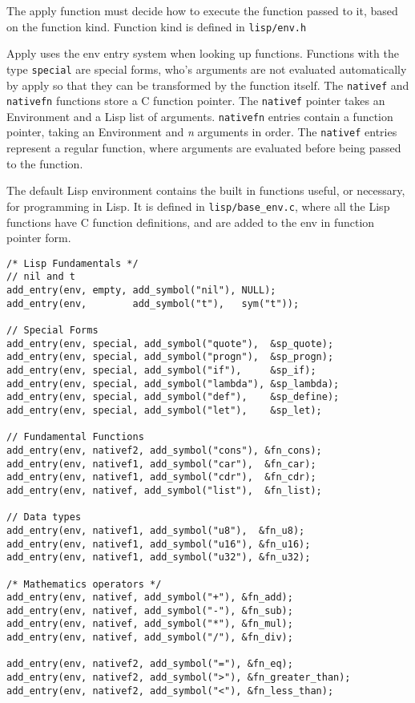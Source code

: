 \documentclass[10pt]{report}
\begin{document}
The apply function must decide how to execute the function passed to it, based on the function kind. Function kind is defined in \texttt{lisp/env.h} 



Apply uses the env entry system when looking up functions. Functions with the type \texttt{special} are special forms, who's arguments are not evaluated automatically by apply so that they can be transformed by the function itself. The \texttt{nativef} and \texttt{nativefn} functions store a C function pointer. The \texttt{nativef} pointer takes an Environment and a Lisp list of arguments. \texttt{nativefn} entries contain a function pointer, taking an Environment and \textit{n} arguments in order. The \texttt{nativef} entries represent a regular function, where arguments are evaluated before being passed to the function.



The default Lisp environment contains the built in functions useful, or necessary, for programming in Lisp. It is defined in \texttt{lisp/base_env.c}, where all the Lisp functions have C function definitions, and are added to the env in function pointer form.

\begin{lstlisting}
/* Lisp Fundamentals */
// nil and t
add_entry(env, empty, add_symbol("nil"), NULL);
add_entry(env,        add_symbol("t"),   sym("t"));

// Special Forms
add_entry(env, special, add_symbol("quote"),  &sp_quote);
add_entry(env, special, add_symbol("progn"),  &sp_progn);
add_entry(env, special, add_symbol("if"),     &sp_if);
add_entry(env, special, add_symbol("lambda"), &sp_lambda);
add_entry(env, special, add_symbol("def"),    &sp_define);
add_entry(env, special, add_symbol("let"),    &sp_let);	

// Fundamental Functions
add_entry(env, nativef2, add_symbol("cons"), &fn_cons);
add_entry(env, nativef1, add_symbol("car"),  &fn_car);
add_entry(env, nativef1, add_symbol("cdr"),  &fn_cdr);
add_entry(env, nativef, add_symbol("list"),  &fn_list);

// Data types
add_entry(env, nativef1, add_symbol("u8"),  &fn_u8);
add_entry(env, nativef1, add_symbol("u16"), &fn_u16);
add_entry(env, nativef1, add_symbol("u32"), &fn_u32);

/* Mathematics operators */
add_entry(env, nativef, add_symbol("+"), &fn_add);
add_entry(env, nativef, add_symbol("-"), &fn_sub);
add_entry(env, nativef, add_symbol("*"), &fn_mul);
add_entry(env, nativef, add_symbol("/"), &fn_div);

add_entry(env, nativef2, add_symbol("="), &fn_eq);
add_entry(env, nativef2, add_symbol(">"), &fn_greater_than);
add_entry(env, nativef2, add_symbol("<"), &fn_less_than);
\end{lstlisting}
\end{document}

